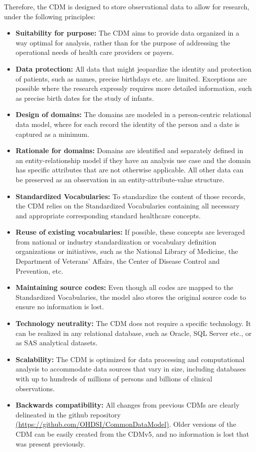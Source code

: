 \documentclass[]{book}
\providecommand{\tightlist}{%
  \setlength{\itemsep}{0pt}\setlength{\parskip}{0pt}}
\begin{document}
Therefore, the CDM is designed to store observational data to allow for
research, under the following principles:

\begin{itemize}
\tightlist
\item
  \textbf{Suitability for purpose:} The CDM aims to provide data
  organized in a way optimal for analysis, rather than for the purpose
  of addressing the operational needs of health care providers or
  payers.
\item
  \textbf{Data protection:} All data that might jeopardize the identity
  and protection of patients, such as names, precise birthdays etc. are
  limited. Exceptions are possible where the research expressly requires
  more detailed information, such as precise birth dates for the study
  of infants.
\item
  \textbf{Design of domains:} The domains are modeled in a
  person-centric relational data model, where for each record the
  identity of the person and a date is captured as a minimum.
\item
  \textbf{Rationale for domains:} Domains are identified and separately
  defined in an entity-relationship model if they have an analysis use
  case and the domain has specific attributes that are not otherwise
  applicable. All other data can be preserved as an observation in an
  entity-attribute-value structure.
\item
  \textbf{Standardized Vocabularies:} To standardize the content of
  those records, the CDM relies on the Standardized Vocabularies
  containing all necessary and appropriate corresponding standard
  healthcare concepts.
\item
  \textbf{Reuse of existing vocabularies:} If possible, these concepts
  are leveraged from national or industry standardization or vocabulary
  definition organizations or initiatives, such as the National Library
  of Medicine, the Department of Veterans' Affairs, the Center of
  Disease Control and Prevention, etc.
\item
  \textbf{Maintaining source codes:} Even though all codes are mapped to
  the Standardized Vocabularies, the model also stores the original
  source code to ensure no information is lost.
\item
  \textbf{Technology neutrality:} The CDM does not require a specific
  technology. It can be realized in any relational database, such as
  Oracle, SQL Server etc., or as SAS analytical datasets.
\item
  \textbf{Scalability:} The CDM is optimized for data processing and
  computational analysis to accommodate data sources that vary in size,
  including databases with up to hundreds of millions of persons and
  billions of clinical observations.
\item
  \textbf{Backwards compatibility:} All changes from previous CDMs are
  clearly delineated in the github repository
  \href{https://github.com/OHDSI/CommonDataModel}{(https://github.com/OHDSI/CommonDataModel)}.
  Older versions of the CDM can be easily created from the CDMv5, and no
  information is lost that was present previously.
\end{itemize}
\end{document}
